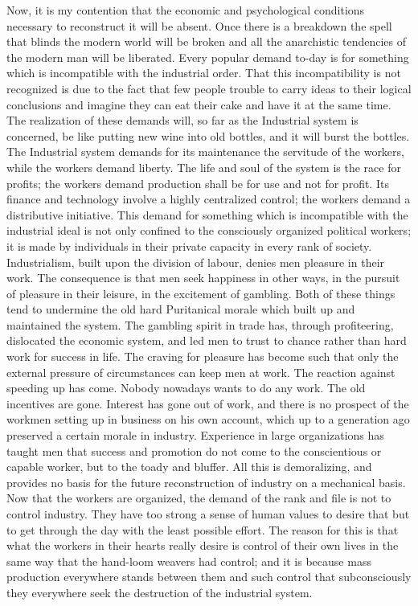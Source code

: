 \documentclass{book}
\begin{document}
Now, it is my contention that the economic and psychological conditions necessary to reconstruct it will be absent. Once there is a breakdown the spell that blinds the modern world will be broken and all the anarchistic tendencies of the modern man will be liberated. Every popular demand to-day is for something which is incompatible with the industrial order. That this incompatibility is not recognized is due to the fact that few people trouble to carry ideas to their logical conclusions and imagine they can eat their cake and have it at the same time. The realization of these demands will, so far as the Industrial system is concerned, be like putting new wine into old bottles, and it will burst the bottles. The Industrial system demands for its maintenance the servitude of the workers, while the workers demand liberty. The life and soul of the system is the race for profits; the workers demand production shall be for use and not for profit. Its finance and technology involve a highly centralized control; the workers demand a distributive initiative. This demand for something which is incompatible with the industrial ideal is not only confined to the consciously organized political workers; it is made by individuals in their private capacity in every rank of society. Industrialism, built upon the division of labour, denies men pleasure in their work. The consequence is that men seek happiness in other ways, in the pursuit of pleasure in their leisure, in the excitement of gambling. Both of these things tend to undermine the old hard Puritanical morale which built up and maintained the system. The gambling spirit in trade has, through profiteering, dislocated the economic system, and led men to trust to chance rather than hard work for success in life. The craving for pleasure has become such that only the external pressure of circumstances can keep men at work. The reaction against speeding up has come. Nobody nowadays wants to do any work. The old incentives are gone. Interest has gone out of work, and there is no prospect of the workmen setting up in business on his own account, which up to a generation ago preserved a certain morale in industry. Experience in large organizations has taught men that success and promotion do not come to the conscientious or capable worker, but to the toady and bluffer. All this is demoralizing, and provides no basis for the future reconstruction of industry on a mechanical basis. Now that the workers are organized, the demand of the rank and file is not to control industry. They have too strong a sense of human values to desire that but to get through the day with the least possible effort. The reason for this is that what the workers in their hearts really desire is control of their own lives in the same way that the hand-loom weavers had control; and it is because mass production everywhere stands between them and such control that subconsciously they everywhere seek the destruction of the industrial system.\footnotemark[5]
\end{document}

